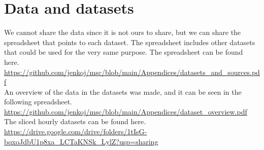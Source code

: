 \section{Data and datasets}

\noindent We cannot share the data since it is not ours to share, but we can share the spreadsheet that points to each dataset.
\noindent The spreadsheet includes other datasets that could be used for the very same purpose.
\noindent The spreadsheet can be found here.  \\

\noindent \url{https://github.com/jenkoj/msc/blob/main/Appendices/datasets_and_sources.pdf} \\

\noindent An overview of the data in the datasets was made, and it can be seen in the following spreadsheet.  \\
\noindent \url{https://github.com/jenkoj/msc/blob/main/Appendices/dataset_overview.pdf} \\

\noindent The sliced hourly datasets can be found here. \\
\noindent \url{https://drive.google.com/drive/folders/1tIsG-bqxoJdbU1p8xa_LCTaKNSk_LylZ?usp=sharing} \\











